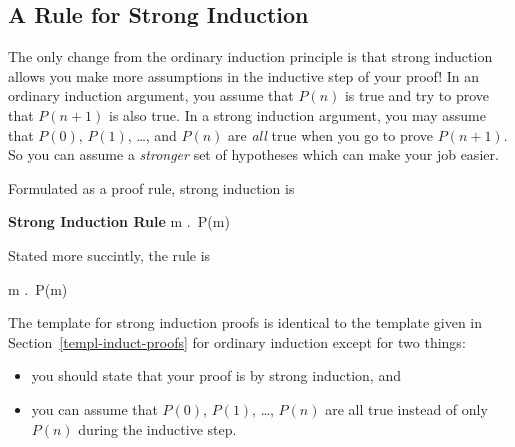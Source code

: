 \subsection{A Rule for Strong Induction}


The only change from the ordinary induction principle is that strong
induction allows you make more assumptions in the inductive step of
your proof!  In an ordinary induction argument, you assume that $P(n)$
is true and try to prove that $P(n+1)$ is also true.  In a strong
induction argument, you may assume that $P(0)$, $P(1)$, \dots, and
$P(n)$ are \emph{all} true when you go to prove $P(n+1)$.  So you can
assume a \emph{stronger} set of hypotheses which can make your job
easier.

Formulated as a proof rule, strong induction is
\begin{rul*} \textbf{Strong Induction Rule}
{\forall m \in \naturals.\, P(m)}
\end{rul*}

Stated more succintly, the rule is
\begin{rul*}%
{\forall m \in \naturals.\, P(m)}
\end{rul*}

The template for strong induction proofs is identical to the template
given in Section~\ref{templ-induct-proofs} for ordinary induction
except for two things:
\begin{itemize}

\item
you should state that your proof is by strong induction, and

\item
you can assume that $P(0)$, $P(1)$, \dots, $P(n)$ are all true instead
of only $P(n)$ during the inductive step.

\end{itemize}

